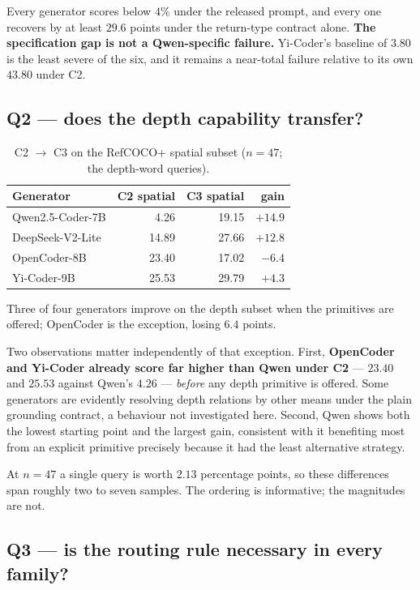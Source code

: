Every generator scores below $4\%$ under the released prompt, and every one recovers
by at least $29.6$ points under the return-type contract alone.
\textbf{The specification gap is not a Qwen-specific failure.} Yi-Coder's baseline of
$3.80$ is the least severe of the six, and it remains a near-total failure relative to
its own $43.80$ under C2.

\subsection{Q2 --- does the depth capability transfer?}

\begin{table}[htbp]\centering
\caption{C2 $\to$ C3 on the RefCOCO+ spatial subset ($n=47$; the depth-word queries).}
\label{tab:m4-q2}
\begin{tabular}{@{}lrrr@{}}
\toprule
\textbf{Generator} & \textbf{C2 spatial} & \textbf{C3 spatial} & \textbf{gain} \\
\midrule
Qwen2.5-Coder-7B & 4.26 & 19.15 & $+14.9$ \\
DeepSeek-V2-Lite & 14.89 & 27.66 & $+12.8$ \\
OpenCoder-8B & 23.40 & 17.02 & $-6.4$ \\
Yi-Coder-9B & 25.53 & 29.79 & $+4.3$ \\
\bottomrule
\end{tabular}
\end{table}

Three of four generators improve on the depth subset when the primitives are offered;
OpenCoder is the exception, losing $6.4$ points.

Two observations matter independently of that exception. First, \textbf{OpenCoder and
Yi-Coder already score far higher than Qwen under C2} --- $23.40$ and $25.53$ against
Qwen's $4.26$ --- \emph{before} any depth primitive is offered. Some generators are
evidently resolving depth relations by other means under the plain grounding contract,
a behaviour not investigated here. Second, Qwen shows both the lowest starting point
and the largest gain, consistent with it benefiting most from an explicit primitive
precisely because it had the least alternative strategy.

At $n=47$ a single query is worth $2.13$ percentage points, so these differences span
roughly two to seven samples. The ordering is informative; the magnitudes are not.

\subsection{Q3 --- is the routing rule necessary in every family?}

